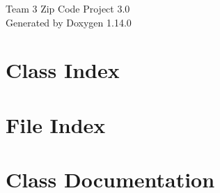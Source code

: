 \documentclass[twoside]{book}
\newcommand{\+}{\discretionary{\mbox{\scriptsize$\hookleftarrow$}}{}{}}
\newcommand{\clearemptydoublepage}{%
    \newpage{\pagestyle{empty}\cleardoublepage}%
  }
\begin{document}
  \raggedbottom
    \hypersetup{pageanchor=false,
                bookmarksnumbered=true,
                pdfencoding=unicode
               }
  \begin{titlepage}
  \vspace*{7cm}
  \begin{center}%
  {\Large Team 3 Zip Code Project 3.\+0}\\
  \vspace*{1cm}
  {\large Generated by Doxygen 1.14.0}\\
  \end{center}
  \end{titlepage}
  \clearemptydoublepage
  \tableofcontents
  \clearemptydoublepage
  \hypersetup{pageanchor=true}
\chapter{Class Index}

\chapter{File Index}

\chapter{Class Documentation}















\end{document}
